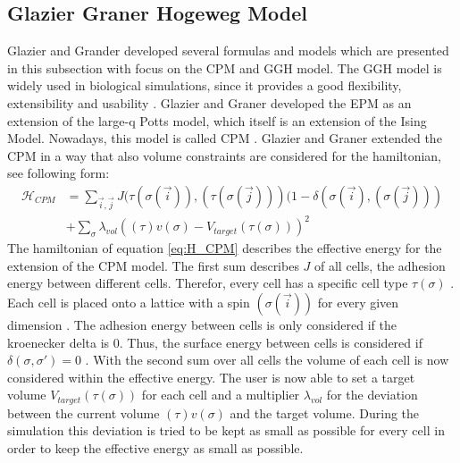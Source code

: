 \subsection{Glazier Graner Hogeweg Model} \label{subsec:Intro_GGH}
Glazier and Grander developed several formulas and models which are presented in this subsection with focus on the \ac{CPM} and \ac{GGH} model.\newline
The \ac{GGH} model is widely used in biological simulations, since it provides a good flexibility, extensibility and usability \cite{Glazier2007}. 
Glazier and Graner developed the \ac{EPM} as an extension of the large-q Potts model, which itself is an extension of the Ising Model. Nowadays, this model is called \ac{CPM} \cite{Glazier2007, Graner1992, Glazier1993}. Glazier and Graner extended the \ac{CPM} in a way that also volume constraints are considered for the hamiltonian, see following form:
\begin{equation}\label{eq:H_CPM}
\begin{split}
\mathcal{H}_{CPM} & = \sum_{\vec{i},\vec{j}}^{ }J(\tau(\sigma(\vec{i})),(\tau(\sigma(\vec{j})))(1-\delta(\sigma(\vec{i}),(\sigma(\vec{j}))) \\
		 & + \sum_{\sigma}^{}{\lambda_{vol}((\tau)v(\sigma)-V_{target}(\tau(\sigma)))^2}
\end{split}
\end{equation}
The hamiltonian of equation \ref{eq:H_CPM} describes the effective energy for the extension of the \ac{CPM} model. The first sum describes $J$ of all cells, the adhesion energy between different cells. Therefor, every cell has a specific cell type $\tau(\sigma)$ \cite{Glazier1993, Graner1992}. Each cell is placed onto a lattice with a spin $(\sigma(\vec{i}))$ for every given dimension \cite{Graner1992, Glazier2007}. The adhesion energy between cells is only considered if the kroenecker delta is 0. Thus, the surface energy between cells is considered if $\delta(\sigma, \sigma') = 0$ \cite{Glazier1993, Graner1992, Stott1999, Glazier2007, Chen2007, Cickovski2005}. \newline
With the second sum over all cells the volume of each cell is now considered within the effective energy. The user is now able to set a target volume $V_{target}(\tau(\sigma))$ for each cell and a multiplier $\lambda_{vol}$ for the deviation between the current volume $(\tau)v(\sigma)$ and the target volume. During the simulation this deviation is tried to be kept as small as possible for every cell in order to keep the effective energy as small as possible.

